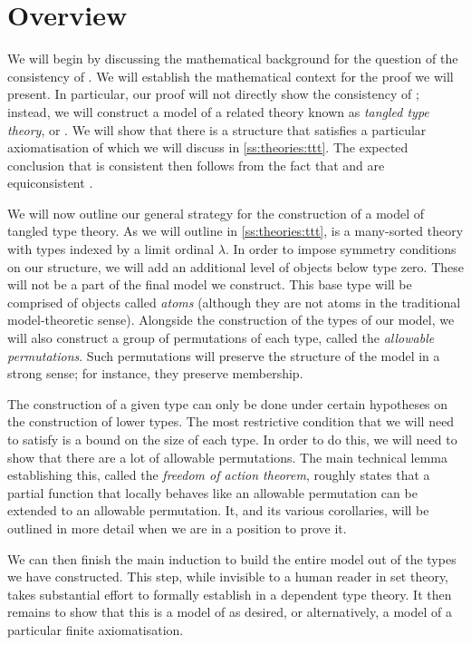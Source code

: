 \section{Overview}
\label{s:overview}

We will begin by discussing the mathematical background for the question of the consistency of \NF.
We will establish the mathematical context for the proof we will present.
In particular, our proof will not directly show the consistency of \NF; instead, we will construct a model of a related theory known as \emph{tangled type theory}, or \TTT.
We will show that there is a structure that satisfies a particular axiomatisation of {\TTT} which we will discuss in \cref{ss:theories:ttt}.
The expected conclusion that {\NF} is consistent then follows from the fact that {\NF} and {\TTT} are equiconsistent \cite{holmes-ttt}.

We will now outline our general strategy for the construction of a model of tangled type theory.
As we will outline in \cref{ss:theories:ttt}, {\TTT} is a many-sorted theory with types indexed by a limit ordinal \( \lambda \).
In order to impose symmetry conditions on our structure, we will add an additional level of objects below type zero.
These will not be a part of the final model we construct.
This base type will be comprised of objects called \emph{atoms} (although they are not atoms in the traditional model-theoretic sense).
Alongside the construction of the types of our model, we will also construct a group of permutations of each type, called the \emph{allowable permutations}.
Such permutations will preserve the structure of the model in a strong sense; for instance, they preserve membership.

The construction of a given type can only be done under certain hypotheses on the construction of lower types.
The most restrictive condition that we will need to satisfy is a bound on the size of each type.
In order to do this, we will need to show that there are a lot of allowable permutations.
The main technical lemma establishing this, called the \emph{freedom of action theorem}, roughly states that a partial function that locally behaves like an allowable permutation can be extended to an allowable permutation.
It, and its various corollaries, will be outlined in more detail when we are in a position to prove it.

We can then finish the main induction to build the entire model out of the types we have constructed.
This step, while invisible to a human reader in set theory, takes substantial effort to formally establish in a dependent type theory.
It then remains to show that this is a model of {\TTT} as desired, or alternatively, a model of a particular finite axiomatisation.

